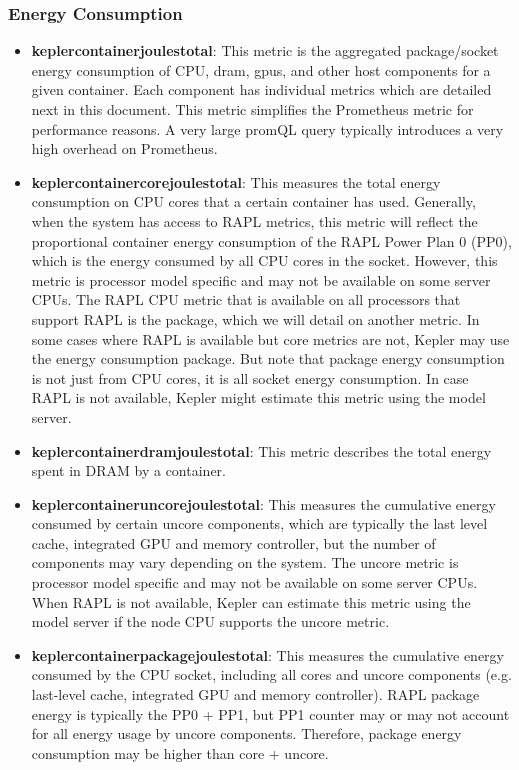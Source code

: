 \subsubsection{Energy Consumption}
\begin{itemize}
    \item \textbf{kepler\textunderscore container\textunderscore joules\textunderscore total}: This metric is the aggregated package/socket energy consumption of CPU, dram, gpus, and other host components for a given container. Each component has individual metrics which are detailed next in this document.
    This metric simplifies the Prometheus metric for performance reasons. A very large promQL query typically introduces a very high overhead on Prometheus.
    \item \textbf{kepler\textunderscore container\textunderscore core\textunderscore joules\textunderscore total}: This measures the total energy consumption on CPU cores that a certain container has used. Generally, when the system has access to RAPL metrics, this metric will reflect the proportional container energy consumption of the RAPL Power Plan 0 (PP0), which is the energy consumed by all CPU cores in the socket. However, this metric is processor model specific and may not be available on some server CPUs. The RAPL CPU metric that is available on all processors that support RAPL is the package, which we will detail on another metric.
    In some cases where RAPL is available but core metrics are not, Kepler may use the energy consumption package. But note that package energy consumption is not just from CPU cores, it is all socket energy consumption.
    In case RAPL is not available, Kepler might estimate this metric using the model server.
    \item \textbf{kepler\textunderscore container\textunderscore dram\textunderscore joules\textunderscore total}: This metric describes the total energy spent in DRAM by a container.
    \item \textbf{kepler\textunderscore container\textunderscore uncore\textunderscore joules\textunderscore total}: This measures the cumulative energy consumed by certain uncore components, which are typically the last level cache, integrated GPU and memory controller, but the number of components may vary depending on the system. The uncore metric is processor model specific and may not be available on some server CPUs.
    When RAPL is not available, Kepler can estimate this metric using the model server if the node CPU supports the uncore metric.
    \item \textbf{kepler\textunderscore container\textunderscore package\textunderscore joules\textunderscore total}: This measures the cumulative energy consumed by the CPU socket, including all cores and uncore components (e.g. last-level cache, integrated GPU and memory controller). RAPL package energy is typically the PP0 + PP1, but PP1 counter may or may not account for all energy usage by uncore components. Therefore, package energy consumption may be higher than core + uncore.

\end{itemize}
